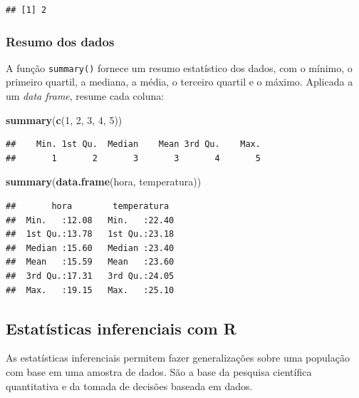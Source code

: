 \documentclass[
]{book}
\newenvironment{Shaded}{\begin{snugshade}}{\end{snugshade}}
\newcommand{\DecValTok}[1]{\textcolor[rgb]{0.00,0.00,0.81}{#1}}
\newcommand{\FunctionTok}[1]{\textcolor[rgb]{0.13,0.29,0.53}{\textbf{#1}}}
\newcommand{\NormalTok}[1]{#1}
\begin{document}
\begin{verbatim}
## [1] 2
\end{verbatim}

\subsubsection{Resumo dos dados}\label{resumo-dos-dados}

A função \texttt{summary()} fornece um resumo estatístico dos dados, com o mínimo, o primeiro quartil, a mediana, a média, o terceiro quartil e o máximo. Aplicada a um \emph{data frame}, resume cada coluna:

\begin{Shaded}
\begin{Highlighting}[]
\FunctionTok{summary}\NormalTok{(}\FunctionTok{c}\NormalTok{(}\DecValTok{1}\NormalTok{, }\DecValTok{2}\NormalTok{, }\DecValTok{3}\NormalTok{, }\DecValTok{4}\NormalTok{, }\DecValTok{5}\NormalTok{))}
\end{Highlighting}
\end{Shaded}

\begin{verbatim}
##    Min. 1st Qu.  Median    Mean 3rd Qu.    Max. 
##       1       2       3       3       4       5
\end{verbatim}

\begin{Shaded}
\begin{Highlighting}[]
\FunctionTok{summary}\NormalTok{(}\FunctionTok{data.frame}\NormalTok{(hora, temperatura))}
\end{Highlighting}
\end{Shaded}

\begin{verbatim}
##       hora        temperatura   
##  Min.   :12.08   Min.   :22.40  
##  1st Qu.:13.78   1st Qu.:23.18  
##  Median :15.60   Median :23.40  
##  Mean   :15.59   Mean   :23.60  
##  3rd Qu.:17.31   3rd Qu.:24.05  
##  Max.   :19.15   Max.   :25.10
\end{verbatim}

\subsection{Estatísticas inferenciais com R}\label{estatuxedsticas-inferenciais-com-r}

As estatísticas inferenciais permitem fazer generalizações sobre uma população com base em uma amostra de dados. São a base da pesquisa científica quantitativa e da tomada de decisões baseada em dados.
\end{document}
